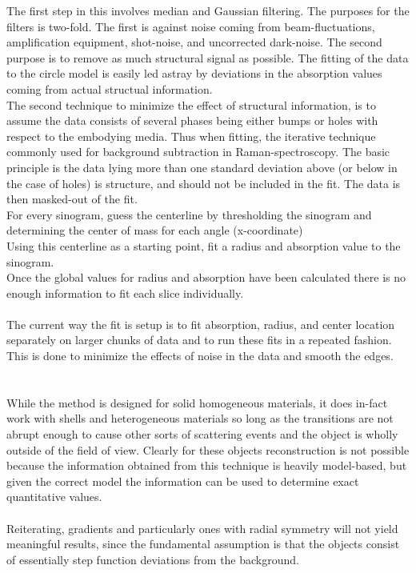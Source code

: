 The first step in this involves median and Gaussian filtering. The purposes for the filters is two-fold. The first is against noise coming from beam-fluctuations, amplification equipment, shot-noise, and uncorrected dark-noise. The second purpose is to remove as much structural signal as possible. The fitting of the data to the circle model is easily led astray by deviations in the absorption values coming from actual structual information.\\
The second technique to minimize the effect of structural information, is to assume the data consists of several phases being either bumps or holes with respect to the embodying media. Thus when fitting, the iterative technique commonly used for background subtraction in Raman-spectroscopy. The basic principle is the data lying more than one standard deviation above (or below in the case of holes) is structure, and should not be included in the fit. The data is then masked-out of the fit.\\
For every sinogram, guess the centerline by thresholding the sinogram and determining the center of mass for each angle (x-coordinate)\\
Using this centerline as a starting point, fit a radius and absorption value to the sinogram.\\
Once the global values for radius and absorption have been calculated there is no enough information to fit each slice individually. \\
\\
The current way the fit is setup is to fit absorption, radius, and center location separately on larger chunks of data and to run these fits in a repeated fashion. This is done to minimize the effects of noise in the data and smooth the edges.\\
\\
\\
While the method is designed for solid homogeneous materials, it does in-fact work with shells and heterogeneous materials so long as the transitions are not abrupt enough to cause other sorts of scattering events and the object is wholly outside of the field of view. Clearly for these objects reconstruction is not possible because the information obtained from this technique is heavily model-based, but given the correct model the information can be used to determine exact quantitative values.\\
\\
Reiterating, gradients and particularly ones with radial symmetry will not yield meaningful results, since the fundamental assumption is that the objects consist of essentially step function deviations from the background.

